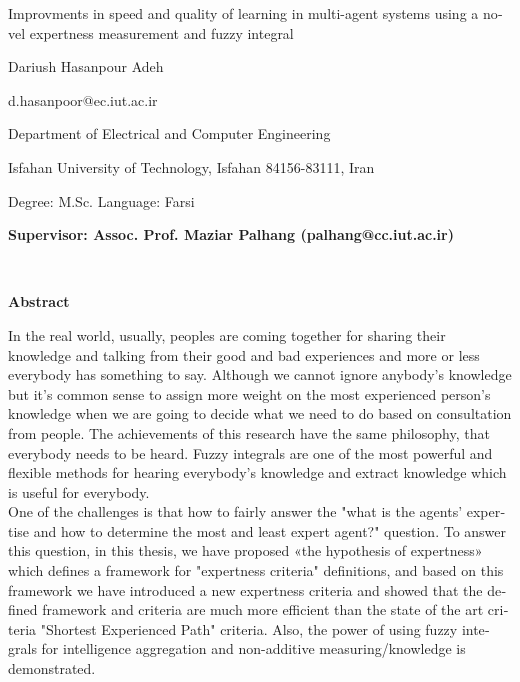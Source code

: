 \thispagestyle{empty}

\begin{latin}
\begin{center}

{\Huge Improvments in speed and quality of learning in multi-agent systems using a novel expertness measurement and fuzzy integral}

\vspace{1cm}

{\LARGE{Dariush Hasanpour Adeh}}

\vspace{0.2cm}

{\small d.hasanpoor@ec.iut.ac.ir}

%

\vspace{0.5cm}

Department of Electrical and Computer Engineering

\vspace{0.2cm}

Isfahan University of Technology, Isfahan 84156-83111, Iran

\vspace{0.2cm}

Degree: M.Sc. \hspace*{3cm} Language: Farsi

\vspace{1cm}

{\small\textbf{Supervisor: Assoc. Prof. Maziar Palhang (palhang@cc.iut.ac.ir)}}
\end{center}
~\vfill



\noindent\textbf{Abstract}

\bgroup
In the real world, usually, peoples are coming together for sharing their knowledge and talking from their good and bad experiences and more or less everybody has something to say. Although we cannot ignore anybody's knowledge but it's common sense to assign more weight on the most experienced person's knowledge when we are going to decide what we need to do based on consultation from people. The achievements of this research have the same philosophy, that everybody needs to be heard. Fuzzy integrals are one of the most powerful and flexible methods for hearing everybody's knowledge and extract knowledge which is useful for everybody.\\
\indent One of the challenges is that how to fairly answer the "what is the agents' expertise and how to determine the most and least expert agent?" question. To answer this question, in this thesis, we have proposed «the hypothesis of expertness» which defines a framework for "expertness criteria" definitions, and based on this framework we have introduced a new expertness criteria and showed that the defined framework and criteria are much more efficient than the state of the art criteria "Shortest Experienced Path" criteria. Also, the power of using fuzzy integrals for intelligence aggregation and non-additive measuring/knowledge is demonstrated.
\egroup


\end{latin}
